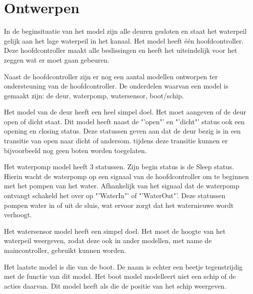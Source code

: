 \documentclass{article}
\begin{document}
\clearpage

\section{Ontwerpen} %
In de beginsituatie van het model zijn alle deuren gesloten en staat het waterpeil gelijk aan het lage waterpeil in het kanaal. Het model heeft één hoofdcontroller. Deze hoofdcontroller maakt alle beslissingen en heeft het uiteindelijk voor het zeggen wat er moet gaan gebeuren.

Naast de hoofdcontroller zijn er nog een aantal modellen ontworpen ter ondersteuning van de hoofdcontroller. De onderdelen waarvan een model is gemaakt zijn: de deur, waterpomp, watersensor, boot/schip.


\vskip0.5cm

Het model van de deur heeft een heel simpel doel. Het moet aangeven of de deur open of dicht staat. Dit model heeft naast de "'open"' en "'dicht"' status ook een opening en closing status. Deze statussen geven aan dat de deur bezig is in een transitie van open naar dicht of andersom. tijdens deze transitie kunnen er bijvoorbeeld nog geen boten worden toegelaten.

\vskip0.5cm

Het waterpomp model heeft 3 statussen. Zijn begin status is de Sleep status. Hierin wacht de waterpomp op een signaal van de hoofdcontroller om te beginnen met het pompen van het water. Afhankelijk van het signaal dat de waterpomp ontvangt schakeld het over op "'WaterIn"' of "'WaterOut"'. Deze statussen pompen water in of uit de sluis, wat ervoor zorgt dat het waternieuwe wordt verhoogt.

Het watersensor model heeft een simpel doel. Het moet de hoogte van het waterpeil weergeven, zodat deze ook in ander modellen, met name de maincontroller, gebruikt kunnen worden.

Het laatste model is die van de boot. De naam is echter een beetje tegenstrijdig met de functie van dit model. Het boot model modelleert niet een schip of de acties daarvan. Dit model heeft als die de positie van het schip weergeven.





\clearpage

\end{document}
